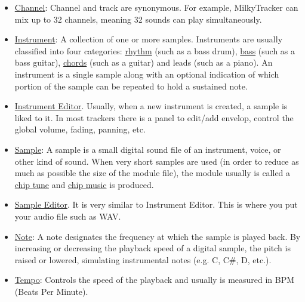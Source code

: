 \begin{itemize}
\item
  \href{http://en.wikipedia.org/wiki/Ultimate_Soundtracker}{Channel}:
  Channel and track are synonymous. For example, MilkyTracker can mix
  up to 32 channels, meaning 32 sounds can play simultaneously.

\item
  \href{http://en.wikipedia.org/wiki/Musical_instrument}{Instrument}:
  A collection of one or more samples. Instruments are usually
  classified into four categories:
  \href{http://en.wikipedia.org/wiki/Rhythm_section#Instruments}{rhythm}
  (such as a bass drum),
  \href{http://en.wikipedia.org/wiki/Bass\_\%28instrument\%29}{bass}
  (such as a bass guitar),
  \href{http://www.howmusicworks.org/300/Chords-and-Harmony}{chords}
  (such as a guitar) and leads (such as a piano). An instrument is a
  single sample along with an optional indication of which portion of
  the sample can be repeated to hold a sustained note.

\item
  \href{http://dem0lecule.newgrounds.com/news/post/753500}{Instrument
    Editor}. Usually, when a new instrument is created, a sample is
  liked to it. In most trackers there is a panel to edit/add envelop,
  control the global volume, fading, panning, etc.

\item \href{http://en.wikipedia.org/wiki/Module_file}{Sample}: A
  sample is a small digital sound file of an instrument, voice, or
  other kind of sound. When very short samples are used (in order to
  reduce as much as possible the size of the module file), the module
  usually is called a
  \href{http://en.wikipedia.org/wiki/Chiptune}{chip tune} and
  \href{http://woolyss.com/chipmusic.php}{chip music} is produced.

\item \href{http://dem0lecule.newgrounds.com/news/post/753500}{Sample
    Editor}. It is very similar to Instrument Editor. This is where
  you put your audio file such as WAV.

\item \href{http://en.wikipedia.org/wiki/Note}{Note}: A note
  designates the frequency at which the sample is played back. By
  increasing or decreasing the playback speed of a digital sample, the
  pitch is raised or lowered, simulating instrumental notes (e.g. C,
  C\#, D, etc.).

\item \href{http://en.wikipedia.org/wiki/Tempo}{Tempo}: Controls the
  speed of the playback and usually is measured in BPM (Beats Per
  Minute).


\end{itemize}
